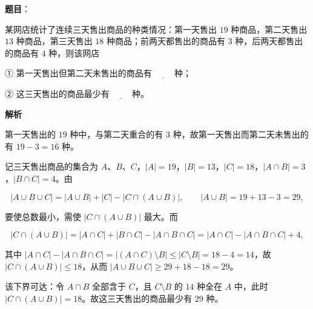 \begin{answer}

\textbf{题目}：

某网店统计了连续三天售出商品的种类情况：第一天售出 \(19\) 种商品，第二天售出 \(13\) 种商品，第三天售出 \(18\) 种商品；前两天都售出的商品有 \(3\) 种，后两天都售出的商品有 \(4\) 种，则该网店

① 第一天售出但第二天未售出的商品有 \(\underline{\qquad}\) 种；

② 这三天售出的商品最少有 \(\underline{\qquad}\) 种。

\textbf{解析}


第一天售出的 \(19\) 种中，与第二天重合的有 \(3\) 种，故第一天售出而第二天未售出的有 \(19-3=16\) 种。


记三天售出商品的集合为 \(A\)、\(B\)、\(C\)，\(|A|=19\)，\(|B|=13\)，\(|C|=18\)，\(|A\cap B|=3\)，\(|B\cap C|=4\)。由

\nopagebreak[4]
\[
|A\cup B\cup C|=|A\cup B|+|C|-|C\cap(A\cup B)|,\qquad |A\cup B|=19+13-3=29,
\]

要使总数最小，需使 \(|C\cap(A\cup B)|\) 最大。而

\nopagebreak[4]
\[
|C\cap(A\cup B)|=|A\cap C|+|B\cap C|-|A\cap B\cap C|
=|A\cap C|-|A\cap B\cap C|+4,
\]

其中 \(|A\cap C|-|A\cap B\cap C|=|(A\cap C)\setminus B|\leqslant|C\setminus B|=18-4=14\)，故 \(|C\cap(A\cup B)|\leqslant18\)，从而 \(|A\cup B\cup C|\geqslant29+18-18=29\)。

该下界可达：令 \(A\cap B\) 全部含于 \(C\)，且 \(C\setminus B\) 的 \(14\) 种全在 \(A\) 中，此时 \(|C\cap(A\cup B)|=18\)。故这三天售出的商品最少有 \(29\) 种。


\end{answer}
